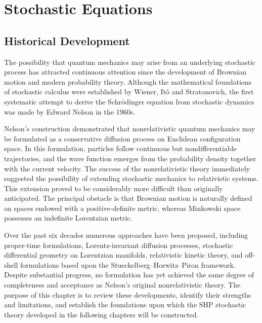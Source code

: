 \chapter{Stochastic Equations }
\section{Historical Development}
The possibility that quantum mechanics may arise from an underlying
stochastic process has attracted continuous attention since the
development of Brownian motion and modern probability theory. Although
the mathematical foundations of stochastic calculus were established by
Wiener, Itô and Stratonovich, the first systematic attempt to derive the
Schrödinger equation from stochastic dynamics was made by Edward Nelson
in the 1960s.

Nelson's construction demonstrated that nonrelativistic quantum
mechanics may be formulated as a conservative diffusion process on
Euclidean configuration space. In this formulation, particles follow
continuous but nondifferentiable trajectories, and the wave function
emerges from the probability density together with the current velocity.
The success of the nonrelativistic theory immediately suggested the
possibility of extending stochastic mechanics to relativistic systems.
This extension proved to be considerably more difficult than originally
anticipated. The principal obstacle is that Brownian motion is naturally
defined on spaces endowed with a positive-definite metric, whereas
Minkowski space possesses an indefinite Lorentzian metric.

Over the past six decades numerous approaches have been proposed,
including proper-time formulations, Lorentz-invariant diffusion
processes, stochastic differential geometry on Lorentzian manifolds,
relativistic kinetic theory, and off-shell formulations based upon the
Stueckelberg--Horwitz--Piron framework.
Despite substantial progress, no formulation has yet achieved the same
degree of completeness and acceptance as Nelson's original
nonrelativistic theory. The purpose of this chapter is to review these
developments, identify their strengths and limitations, and establish
the foundations upon which the SHP stochastic theory developed in the
following chapters will be constructed.
